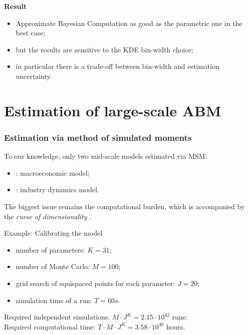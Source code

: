 \documentclass[10pt]{beamer}
\begin{document}
\begin{frame}[c]
	\alert{\textbf{Result}}
	\begin{itemize}
		\item Approximate Bayesian Computation as good as the parametric one in the best case;
		\item but the results are sensitive to the KDE bin-width choice;
		\item in particular there is a trade-off between bin-width and estimation uncertainty.
	\end{itemize} \bigskip
\end{frame}


\section{Estimation of large-scale ABM}
\label{sec:largescale_abm}




\begin{frame}[c]\frametitle{Estimation via method of simulated moments}
	To our knowledge, only two mid-scale models estimated via MSM:
	\begin{itemize}
		\item \citet{bianchi2007calibrating}: macroeconomic model;
		\item \citet{guerini2020governance}: industry dynamics model.
	\end{itemize}
	The biggest issue remains the computational burden, which is accompanied by the \emph{curse of dimensionality} \citep{de2005book}. \bigskip

	\begin{alertblock}{Example: Calibrating the \citet{dosi2015fiscal} model}
		\begin{itemize}
			\item number of parameters: $K = 31$;
			\item number of Monte Carlo: $M = 100$;
			\item grid search of equispaced points for each parameter: $J = 20$;
			\item simulation time of a run: $T = 60s$.
		\end{itemize} \smallskip
		Required independent simulations: $M \cdot J^{K} = 2.15 \cdot 10^{42}$ runs; \\
		Required computational time: $T \cdot M \cdot J^{K} = 3.58 \cdot 10^{40}$ hours.	
	\end{alertblock}
\end{frame}
\end{document}
